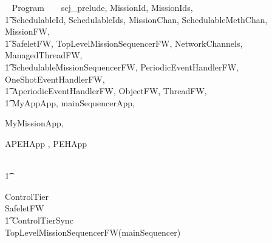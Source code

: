 
%
\begin{zsection}
  \SECTION ~ Program ~ \parents ~ scj\_prelude, MissionId, MissionIds, \\
  \t1 SchedulableId, SchedulableIds, MissionChan, SchedulableMethChan, MissionFW,\\
  \t1 SafeletFW, TopLevelMissionSequencerFW, NetworkChannels, ManagedThreadFW, \\
  \t1 SchedulableMissionSequencerFW, PeriodicEventHandlerFW, OneShotEventHandlerFW,\\
  \t1 AperiodicEventHandlerFW, ObjectFW, ThreadFW, \\
  \t1 MyAppApp, mainSequencerApp,

MyMissionApp,

APEHApp
	,
PEHApp
	
\\ \t1
	
	
\end{zsection}
%
\begin{circus}
\circprocess ControlTier \circdef \\
\circblockopen
SafeletFW \\
\t1 \lpar ControlTierSync \rpar \\
TopLevelMissionSequencerFW(mainSequencer)
\circblockclose
\end{circus}
%


